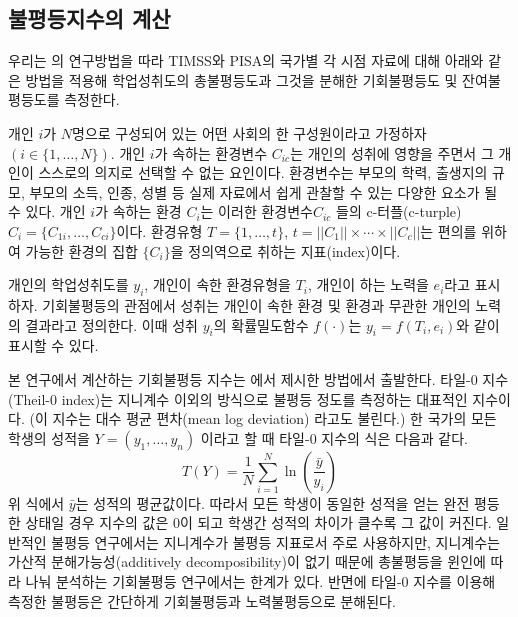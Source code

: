 \subsection{불평등지수의 계산}
우리는 \citet{mnr13}의 연구방법을 따라 TIMSS와 PISA의 국가별 각 시점 자료에 대해 아래와 같은 방법을 적용해 학업성취도의 총불평등도과 그것을 분해한 기회불평등도 및 잔여불평등도를 측정한다. 

개인 $i$가 $N$명으로 구성되어 있는 어떤 사회의 한 구성원이라고 가정하자$(i \in \{1,\ldots,N \} )$.
개인 $i$가 속하는 환경변수 $C_{ic}$는 개인의 성취에 영향을 주면서 그 개인이 스스로의 의지로 선택할 수 없는 요인이다.
환경변수는 부모의 학력, 출생지의 규모, 부모의 소득, 인종, 성별 등 실제 자료에서 쉽게 관찰할 수 있는 다양한 요소가 될 수 있다.
개인 $i$가 속하는 환경 $C_i$는 이러한 환경변수$C_{ic}$ 들의 c-터플(c-turple) $C_i = \{C_{1i}, \ldots , C_{ci}\}$이다. 
환경유형 $T= \{1, \ldots , t \}$, $t= ||C_1|| \times \cdots \times ||C_c||$는 편의를 위하여 가능한 환경의 집합 $\{ C_i \}$을 정의역으로 취하는 지표(index)이다.

개인의 학업성취도를 $y_i$, 개인이 속한 환경유형을 $T_i$, 개인이 하는 노력을 $e_i$라고 표시하자.
기회불평등의 관점에서 성취는 개인이 속한 환경 및 환경과 무관한 개인의 노력의 결과라고 정의한다.
이때 성취 $y_i$의 확률밀도함수 $f(\cdot)$는 $ y_i = f(T_i, e_i)$와 같이 표시할 수 있다.

본 연구에서 계산하는 기회불평등 지수는 \citet{fng11}에서 제시한 방법에서 출발한다.
타일-0 지수(Theil-0 index)는 지니계수 이외의 방식으로 불평등 정도를 측정하는 대표적인 지수이다. (이 지수는 대수 평균 편차(mean log deviation) 라고도  불린다.) 
한 국가의 모든 학생의 성적을 $Y= (y_1, \ldots , y_n)$ 이라고 할 때 타일-0 지수의 식은 다음과 같다.
\begin{equation}
\label{eq:theil0}
 T(Y)=\frac{1}{N} \sum_{i=1}^{N} \ln \left(\frac{\bar{y}}{y_{i}}\right)
\end{equation} 
위 식에서 $\bar{y}$는 성적의 평균값이다.
따라서 모든 학생이 동일한 성적을 얻는 완전 평등한 상태일 경우 지수의 값은 0이 되고 학생간 성적의 차이가 클수록 그 값이 커진다.
일반적인 불평등 연구에서는 지니계수가 불평등 지표로서 주로 사용하지만, 지니계수는 가산적 분해가능성(additively decomposibility)이 없기 때문에 총불평등을 윈인에 따라 나눠 분석하는 기회불평등 연구에서는 한계가 있다.
반면에 타일-0 지수를 이용해 측정한 불평등은 간단하게 기회불평등과 노력불평등으로 분해된다.

